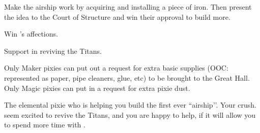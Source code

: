 \documentclass[char]{PP}
\begin{document}
\begin{itemz}
	\item Make the airship work by acquiring and installing a piece of iron. Then present the idea to the Court of Structure and win their approval to build more.
	\item Win \cETitan{}'s affections.
	\item Support \cETitan{} in reviving the Titans.
\end{itemz}

\begin{itemz}[Notes]
	\item Only Maker pixies can put out a request for extra basic supplies (OOC: represented as paper, pipe cleaners, glue, etc) to be brought to the Great Hall. Only Magic pixies can put in a request for extra pixie dust.
\end{itemz}

\begin{contacts}
	\contact{\cEAirship{}} The elemental pixie who is helping you build the first ever ``airship’’.
	\contact{\cETitan{}} Your crush.  \cETitan{\They} seem\cETitan{\plural} excited to revive the Titans, and you are happy to help, if it will allow you to spend more time with \cETitan{\they}.
\end{contacts}
\end{document}
